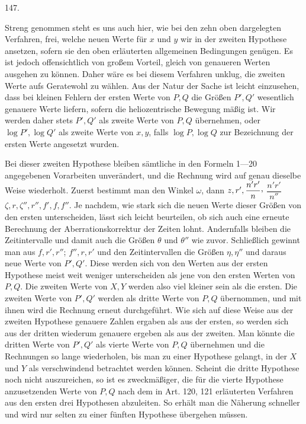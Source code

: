 \par{}\medskip
\begin{center}\hypertarget{native-197-article147}{}147.\end{center}
Streng genommen steht es uns auch hier, wie bei den zehn oben dargelegten Verfahren, frei, welche neuen Werte für $x$ und $y$ wir in der zweiten Hypothese ansetzen, sofern sie den oben erläuterten allgemeinen Bedingungen genügen. Es ist jedoch offensichtlich von großem Vorteil, gleich von genaueren Werten ausgehen zu können. Daher wäre es bei diesem Verfahren unklug, die zweiten Werte aufs Geratewohl zu wählen. Aus der Natur der Sache ist leicht einzusehen, dass bei kleinen Fehlern der ersten Werte von $P,Q$ die Größen $P',Q'$ wesentlich genauere Werte liefern, sofern die heliozentrische Bewegung mäßig ist. Wir werden daher stets $P',Q'$ als zweite Werte von $P,Q$ übernehmen, oder $\log P',\log Q'$ als zweite Werte von $x,y$, falls $\log P,\log Q$ zur Bezeichnung der ersten Werte angesetzt wurden.

Bei dieser zweiten Hypothese bleiben sämtliche in den Formeln 1—20 angegebenen Vorarbeiten unverändert, und die Rechnung wird auf genau dieselbe Weise wiederholt. Zuerst bestimmt man den Winkel $\omega$, dann $z,r',\dfrac{n'r'}{n}\mathpunct{\raisebox{.45ex}{,}}$ $\dfrac{n'r'}{n''}$
$\zeta,r,\zeta'',r'',f',f,f''$. Je nachdem, wie stark sich die neuen Werte dieser Größen von den ersten unterscheiden, lässt sich leicht beurteilen, ob sich auch eine erneute Berechnung der Aberrationskorrektur der Zeiten lohnt. Andernfalls bleiben die Zeitintervalle und damit auch die Größen $\theta$ und $\theta''$ wie zuvor. Schließlich gewinnt man aus $f,r',r''$; $f'',r,r'$ und den Zeitintervallen die Größen $\eta,\eta''$ und daraus neue Werte von $P',Q'$. Diese werden sich von den Werten aus der ersten Hypothese meist weit weniger unterscheiden als jene von den ersten Werten von $P,Q$. Die zweiten Werte von $X,Y$ werden also viel
kleiner sein als die ersten. Die zweiten Werte von $P',Q'$ werden als dritte Werte von $P,Q$ übernommen, und mit ihnen wird die Rechnung erneut durchgeführt.
Wie sich auf diese Weise aus der zweiten Hypothese genauere Zahlen ergaben als aus der ersten, so werden sich aus der dritten wiederum genauere ergeben als aus der zweiten. Man könnte die dritten Werte von $P',Q'$ als vierte Werte von $P,Q$ übernehmen und die Rechnungen so lange wiederholen, bis man zu einer Hypothese gelangt, in der $X$ und $Y$ als verschwindend betrachtet werden können. Scheint die dritte Hypothese noch nicht auszureichen, so ist es zweckmäßiger, die für die vierte Hypothese anzusetzenden Werte von $P,Q$ nach dem in Art. 120, 121 erläuterten Verfahren aus den ersten drei Hypothesen abzuleiten. So erhält man die Näherung schneller und wird nur selten zu einer fünften Hypothese übergehen müssen.
